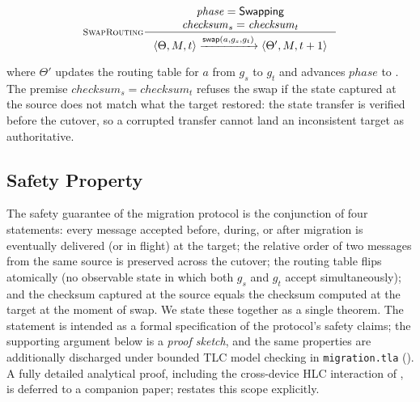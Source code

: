 \begin{equation}
\inference[\textsc{SwapRouting}]
{
  \mathit{phase} = \state{Swapping} \\
  \mathit{checksum}_s = \mathit{checksum}_t
}
{
  \langle \Theta, M, t\rangle
  \trans{\mathsf{swap}(a, g_s, g_t)}
  \langle \Theta', M, t+1\rangle
}
\label{rule:migration-swap}
\end{equation}

\noindent where \(\Theta'\) updates the routing table for \(a\)
from \(g_s\) to \(g_t\) and advances \(\mathit{phase}\) to
.  The premise
\(\mathit{checksum}_s = \mathit{checksum}_t\) refuses the swap if
the state captured at the source does not match what the target
restored: the state transfer is verified before the cutover, so a
corrupted transfer cannot land an inconsistent target as
authoritative.

\subsection{Safety Property}
\label{sec:migration:safety}

The safety guarantee of the migration protocol is the conjunction
of four statements: every message accepted before, during, or
after migration is eventually delivered (or in flight) at the
target; the relative order of two messages from the same source is
preserved across the cutover; the routing table flips atomically
(no observable state in which both \(g_s\) and \(g_t\) accept
simultaneously); and the checksum captured at the source equals
the checksum computed at the target at the moment of swap.  We
state these together as a single theorem.  The statement is
intended as a formal specification of the protocol's safety claims;
the supporting argument below is a \emph{proof sketch}, and the
same properties are additionally discharged under bounded TLC model
checking in \texttt{migration.tla} ().  A fully
detailed analytical proof, including the cross-device HLC
interaction of , is deferred to a
companion paper;  restates this scope
explicitly.

